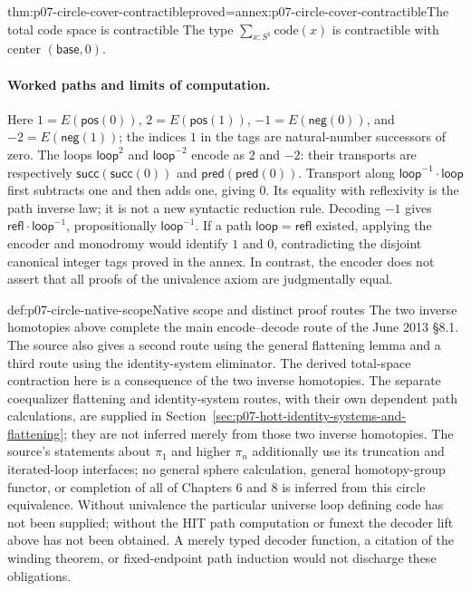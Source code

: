 \begin{hbcorollary}{thm:p07-circle-cover-contractible}{proved=annex:p07-circle-cover-contractible}{The total code space is contractible}
The type \(\sum_{x:S^1}\mathrm{code}(x)\) is contractible with center
\((\mathsf{base},0)\).
\end{hbcorollary}

\paragraph{Worked paths and limits of computation.}
Here \(1=E(\mathsf{pos}(0))\), \(2=E(\mathsf{pos}(1))\),
\(-1=E(\mathsf{neg}(0))\), and \(-2=E(\mathsf{neg}(1))\);
the indices \(1\) in the tags are natural-number successors of zero.
The loops \(\mathsf{loop}^{2}\) and \(\mathsf{loop}^{-2}\) encode as \(2\)
and \(-2\): their transports are respectively
\(\mathsf{succ}(\mathsf{succ}(0))\) and
\(\mathsf{pred}(\mathsf{pred}(0))\).
Transport along \(\mathsf{loop}^{-1}\cdot\mathsf{loop}\) first subtracts
one and then adds one, giving \(0\). Its equality with reflexivity is the
path inverse law; it is not a new syntactic reduction rule. Decoding \(-1\)
gives \(\mathsf{refl}\cdot\mathsf{loop}^{-1}\), propositionally
\(\mathsf{loop}^{-1}\). If a path
\(\mathsf{loop}=\mathsf{refl}\) existed, applying the encoder and monodromy
would identify \(1\) and \(0\), contradicting the disjoint canonical integer
tags proved in the annex. In contrast, the encoder does not assert that
all proofs of the univalence axiom are judgmentally equal.

\begin{proofboundary}{def:p07-circle-native-scope}{Native scope and distinct proof routes}
The two inverse homotopies above complete the main encode--decode route of
the June 2013 \S8.1. The source also gives a second route using the general
flattening lemma and a third route using the identity-system eliminator.
The derived total-space contraction here is a consequence of the two
inverse homotopies. The separate coequalizer flattening and identity-system
routes, with their own dependent path calculations, are supplied in
Section~\ref{sec:p07-hott-identity-systems-and-flattening}; they are not
inferred merely from those two inverse homotopies.
The source's statements about \(\pi_1\) and higher \(\pi_n\) additionally
use its truncation and iterated-loop interfaces; no general sphere
calculation, general homotopy-group functor, or completion of all of
Chapters 6 and 8 is inferred from this circle equivalence.
Without univalence the particular universe loop defining \(\mathrm{code}\)
has not been supplied; without the HIT path computation or funext the
decoder lift above has not been obtained. A merely typed decoder function,
a citation of the winding theorem, or fixed-endpoint path induction would
not discharge these obligations.
\end{proofboundary}
